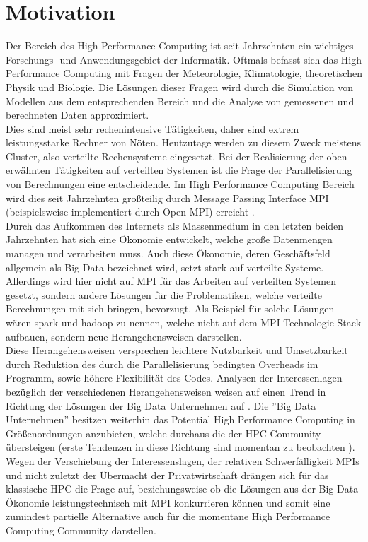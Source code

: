 \documentclass[
	12pt,
	a4paper,
	BCOR10mm,
	DIV14,
	listof=totoc,
	bibliography=totoc,
	headsepline
]{scrreprt}
\begin{document}
\chapter{Motivation}
\label{Motivation}
Der Bereich des High Performance Computing ist seit Jahrzehnten ein wichtiges Forschungs- und Anwendungsgebiet der Informatik.
Oftmals befasst sich das High Performance Computing mit Fragen der Meteorologie, Klimatologie, theoretischen Physik und Biologie.
Die Lösungen dieser Fragen wird durch die Simulation von Modellen aus dem entsprechenden Bereich und die Analyse von gemessenen und berechneten Daten approximiert. \\
Dies sind meist sehr rechenintensive Tätigkeiten, daher sind extrem leistungsstarke Rechner von Nöten.
Heutzutage werden zu diesem Zweck meistens Cluster, also verteilte Rechensysteme eingesetzt.
Bei der Realisierung der oben erwähnten Tätigkeiten auf verteilten Systemen ist die Frage der Parallelisierung von Berechnungen eine entscheidende. 
Im High Performance Computing Bereich wird dies seit Jahrzehnten großteilig durch Message Passing Interface MPI (beispielsweise implementiert durch Open MPI) erreicht \cite{HLR}. \\
Durch das Aufkommen des Internets als Massenmedium in den letzten beiden Jahrzehnten hat sich eine Ökonomie entwickelt, welche große Datenmengen managen und verarbeiten muss.
Auch diese Ökonomie, deren Geschäftsfeld allgemein als Big Data bezeichnet wird, setzt stark auf verteilte Systeme.
Allerdings wird hier nicht auf MPI für das Arbeiten auf verteilten Systemen gesetzt, sondern andere Lösungen für die Problematiken, welche verteilte Berechnungen mit sich bringen, bevorzugt.
Als Beispiel für solche Lösungen wären spark und hadoop zu nennen, welche nicht auf dem MPI-Technologie Stack aufbauen, sondern neue Herangehensweisen darstellen. \\
Diese Herangehensweisen versprechen leichtere Nutzbarkeit und Umsetzbarkeit durch Reduktion des durch die Parallelisierung bedingten Overheads im Programm, sowie höhere Flexibilität des Codes.
Analysen der Interessenlagen bezüglich der verschiedenen Herangehensweisen weisen auf einen Trend in Richtung der Lösungen der Big Data Unternehmen auf \cite{hpcDies}.
Die ''Big Data Unternehmen'' besitzen weiterhin das Potential High Performance Computing in Größenordnungen anzubieten, welche durchaus die der HPC Community übersteigen (erste Tendenzen in diese Richtung sind momentan zu beobachten \cite{HLR}). \\
Wegen der Verschiebung der Interessenslagen, der relativen Schwerfälligkeit MPIs und nicht zuletzt der Übermacht der Privatwirtschaft drängen sich für das klassische HPC die Frage auf, beziehungsweise ob die Lösungen aus der Big Data Ökonomie leistungstechnisch mit MPI konkurrieren können und somit eine zumindest partielle Alternative auch für die momentane High Performance Computing Community darstellen.
\end{document}
